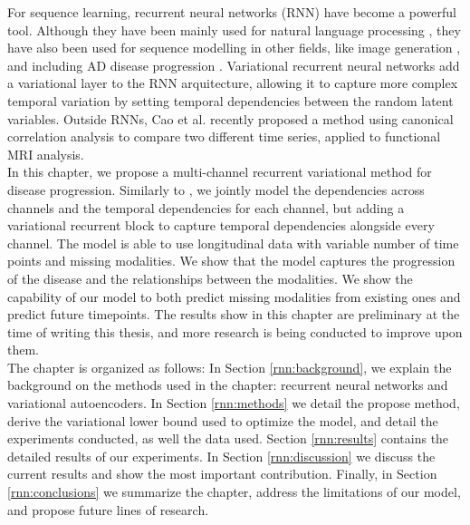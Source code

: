 For sequence learning, recurrent neural networks (RNN) \cite{Hochreiter1997} have become a powerful tool. Although they have been mainly used for natural language processing \cite{Goldberg2017}, they have also been used for sequence modelling in other fields, like image generation \cite{Gregor2015a}, and including AD disease progression \cite{Wang2018,Ghazi2019}. Variational recurrent neural networks \cite{Chung2015,Fabius2015} add a variational layer to the RNN arquitecture, allowing it to capture more complex temporal variation by setting temporal dependencies between the random latent variables. Outside RNNs, Cao et al. \cite{Cao2019} recently proposed a method using canonical correlation analysis to compare two different time series, applied to functional MRI analysis. \\ 

In this chapter, we propose a multi-channel recurrent variational method for disease progression. Similarly to \cite{Antelmi2019}, we jointly model the dependencies across channels and the temporal dependencies for each channel, but adding a variational recurrent block to capture temporal dependencies alongside every channel. The model is able to use longitudinal data with variable number of time points and missing modalities. We show that the model captures the progression of the disease and the relationships between the modalities. We show the capability of our model to both predict missing modalities from existing ones and predict future timepoints. The results show in this chapter are preliminary at the time of writing this thesis, and more research is being conducted to improve upon them. \\

The chapter is organized as follows: In Section \ref{rnn:background}, we explain the background on the methods used in the chapter: recurrent neural networks and variational autoencoders. In Section \ref{rnn:methods} we detail the propose method, derive the variational lower bound used to optimize the model, and detail the experiments conducted, as well the data used. Section \ref{rnn:results} contains the detailed results of our experiments. In Section \ref{rnn:discussion} we discuss the current results and show the most important contribution. Finally, in Section \ref{rnn:conclusions} we summarize the chapter, address the limitations of our model, and propose future lines of research.

